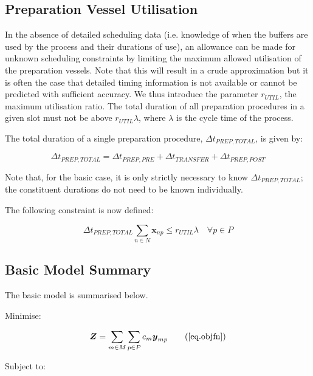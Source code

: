 \subsection{Preparation Vessel Utilisation}\label{SS.constr4}

In the absence of detailed scheduling data (i.e. knowledge of when the buffers
are used by the process and their durations of use), an allowance can be made
for unknown scheduling constraints by limiting the maximum allowed utilisation
of the preparation vessels.  
Note that this will result in a crude approximation but it is often the case
that detailed timing information is not available or cannot be predicted with
sufficient accuracy.
We thus introduce the parameter $r_{UTIL}$, the maximum utilisation ratio.
The total duration of all preparation procedures in a given slot must not
be above $r_{UTIL} \lambda$, where $\lambda$ is the cycle time of the process.

The total duration of a single preparation procedure, $\Delta t_{PREP,TOTAL}$,
is given by:

\begin{equation}
    \Delta t_{PREP,TOTAL} = \Delta t_{PREP,PRE} + \Delta t_{TRANSFER} +
    \Delta t_{PREP,POST}  
\end{equation}

Note that, for the basic case, it is only strictly necessary to know
$\Delta t_{PREP,TOTAL}$; the constituent durations do not need to be known
individually.

The following constraint is now defined:

\begin{equation}
    \Delta t_{PREP,TOTAL} \sum_{n \in N} \boldsymbol{x}_{np} \le r_{UTIL} 
    \lambda \quad \forall p \in P
    \label{eq.constr4}
\end{equation}

\subsection{Basic Model Summary}\label{SS.basicsummary}

The basic model is summarised below.

Minimise:

\begin{equation}
    \boldsymbol{Z} = \sum_{m \in M} \sum_{p \in P} c_m \boldsymbol{y}_{mp}
    \tag{\ref{eq.objfn}}
\end{equation}

Subject to:

